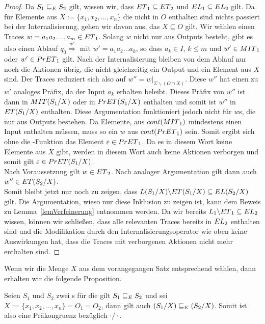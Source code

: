 \begin{proof}
  Da $S_1\sqsubseteq _E S_2$ gilt, wissen wir, dass $ET{}_1\subseteq ET{}_2$ und
  $EL{}_1\subseteq EL{}_2$ gilt. Da für Elemente aus $X:=\{x_1,x_2,\dots
  ,x_n\}$ die nicht in $O$ enthalten sind nichts passiert bei der
  Internalisierung, gehen wir davon aus, das $X\subseteq O$ gilt. Wir wählen
  einen Traces $w=a_1a_2\dots a_m\in ET{}_1$. Solang $w$ nicht nur aus Outputs
  besteht, gibt es also einen Ablauf $q_0 \overset{w'}{\Rightarrow}$ mit
  $w'=a_1a_2\dots a_k$, so dass $a_k\in I$, $k\leq m$ und $w'\in MIT{}_1$ oder
  $w'\in PrET{}_1$ gilt. Nach der Internalisierung bleiben von dem Ablauf nur
  noch die Aktionen übrig, die nicht gleichzeitig ein Output und ein Element
  aus $X$ sind. Der Traces reduziert sich also auf $w''=w|_{\Sigma\backslash
  (O\cap X)}$. Diese $w''$ hat einen zu $w'$ analoges Präfix, da der Input
  $a_k$ erhalten beleibt. Dieses Präfix von $w''$ ist dann in $MIT{}(S_1/X)$
  oder in $PrET{}(S_1/X)$ enthalten und somit ist $w''$ in $ET{}(S_1/X)$
  enthalten. Diese Argumentation funktioniert jedoch nicht für $w$s, die nur
  aus Outputs bestehen. Da Elemente, aus $cont{}(MIT{}_1)$ mindestens einen
  Input enthalten müssen, muss so ein $w$ aus $cont{}(PrET{}_1)$ sein. Somit
  ergibt sich ohne die \cont{}-Funktion das Element $\varepsilon\in PrET{}_1$.
  Da es in diesem Wort keine Elemente aus $X$ gibt, werden in diesem Wort auch
  keine Aktionen verborgen und somit gilt $\varepsilon\in PrET{}(S_1/X)$.\\
  Nach Voraussetzung gilt $w\in ET{}_2$. Nach analoger Argumentation gilt dann
  auch $w''\in ET{}(S_2/X)$.\\
  Somit bleibt jetzt nur noch zu zeigen, dass $L(S_1/X)\backslash ET{}(S_1/X)
  \subseteq EL(S_2/X)$ gilt. Die Argumentation, wieso nur diese Inklusion zu
  zeigen ist, kann dem Beweis zu Lemma~\ref{lemVerfeinerung} entnommen werden.
  Da wir bereits $L_1\backslash ET{}_1\subseteq EL{}_2$ wissen, können wir
  schließen, dass alle relevanten Traces bereits in $EL{}_2$ enthalten sind
  und die Modifikation durch den Internalisierungsoperator wie oben keine
  Auswirkungen hat, dass die Traces mit verborgenen Aktionen nicht mehr
  enthalten sind.
\end{proof}

Wenn wir die Menge $X$ aus dem vorangegangen Satz entsprechend wählen, dann
erhalten wir die folgende Proposition.

\begin{prop}
  \label{propIntrPrae}
  Seien $S_1$ und $S_2$ zwei \EIO{}s für die gilt $S_1\sqsubseteq _E S_2$ und sei
  $X:=\{x_1,x_2,\dots ,x_n\}= O_1 = O_2$, dann gilt auch $(S_1/X)\sqsubseteq _E
  (S_2/X)$. Somit ist also \ERel{} eine Präkongruenz bezüglich $\cdot /\cdot$.
\end{prop}

